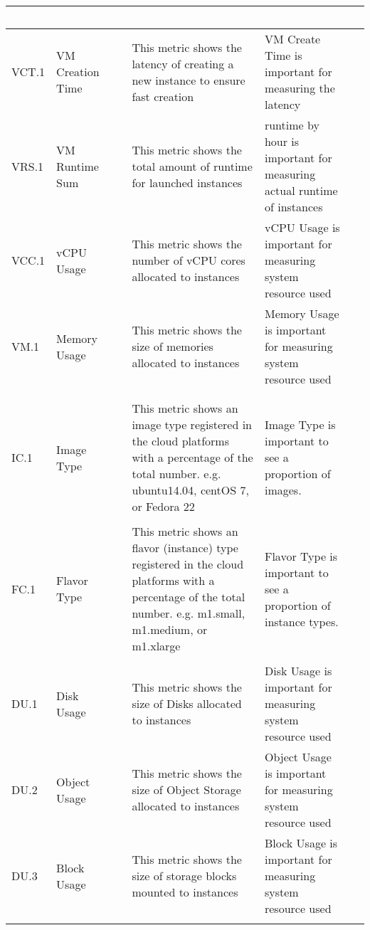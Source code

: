 \begin{table*}[p]
\begin{scriptsize}
\begin{center}
\begin{tabular}{lp{}p{}p{}p{}p{}}
~ \\
\hline
VCT.1 &
VM Creation Time &
~&
This metric shows the latency of creating a new instance to ensure fast creation &
VM Create Time is important for measuring the latency &
~ \\
\hline
VRS.1&
VM Runtime Sum&
~&
This metric shows the total amount of runtime for launched instances &
runtime by hour is important for measuring actual runtime of instances &
~ \\
\hline
VCC.1 &
vCPU Usage &
~&
This metric shows the number of vCPU cores allocated to instances &
vCPU Usage is important for measuring system resource used &
~ \\
\hline
VM.1 &
Memory Usage &
~&
This metric shows the size of memories allocated to instances &
Memory Usage is important for measuring system resource used &
~ \\
& & & & & \\
\hline
\rowcolor{blue!20} \multicolumn{6}{l}{\bf Image related metrics} \\
\hline
IC.1 &
Image Type &
~ &
This metric shows an image type registered in the cloud platforms with a
percentage of the total number. e.g. ubuntu14.04, centOS 7, or Fedora 22 & 
Image Type is important to see a proportion of images. & 
~\\
\hline
\rowcolor{blue!20} \multicolumn{6}{l}{\bf Flavor related metrics} \\
\hline
FC.1 &
Flavor Type &
~ &
This metric shows an flavor (instance) type registered in the cloud platforms with a
percentage of the total number. e.g. m1.small, m1.medium, or m1.xlarge & 
Flavor Type is important to see a proportion of instance types. & 
~\\
\hline
\rowcolor{blue!20} \multicolumn{6}{l}{\bf Storage related metrics} \\
\hline
DU.1 &
Disk Usage &
~&
This metric shows the size of Disks allocated to instances &
Disk Usage is important for measuring system resource used &
~ \\
\hline
DU.2 &
Object Usage &
~&
This metric shows the size of Object Storage allocated to instances &
Object Usage is important for measuring system resource used &
~ \\
\hline
DU.3 &
Block Usage &
~&
This metric shows the size of storage blocks mounted to instances &
Block Usage is important for measuring system resource used &
~ \\
\hline
\rowcolor{blue!20} \multicolumn{6}{l}{\bf Project metrics} \\

\end{tabular}
\end{center}
\end{scriptsize}
\end{table*}
